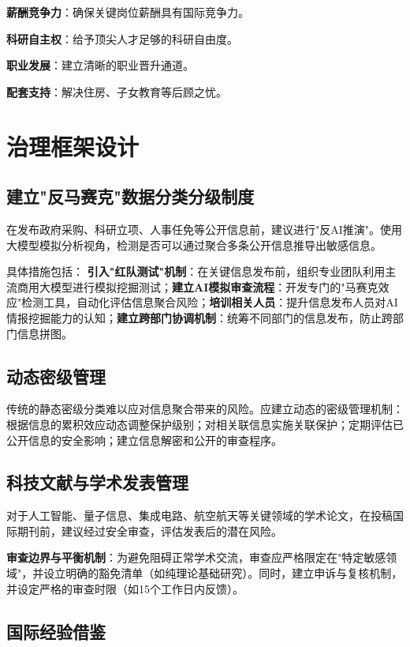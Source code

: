 \textbf{薪酬竞争力}：确保关键岗位薪酬具有国际竞争力。

\textbf{科研自主权}：给予顶尖人才足够的科研自由度。

\textbf{职业发展}：建立清晰的职业晋升通道。

\textbf{配套支持}：解决住房、子女教育等后顾之忧。

\section{治理框架设计}

\subsection{建立"反马赛克"数据分类分级制度}

在发布政府采购、科研立项、人事任免等公开信息前，建议进行"反AI推演"。使用大模型模拟分析视角，检测是否可以通过聚合多条公开信息推导出敏感信息。

具体措施包括：
\textbf{引入"红队测试"机制}：在关键信息发布前，组织专业团队利用主流商用大模型进行模拟挖掘测试；\textbf{建立AI模拟审查流程}：开发专门的"马赛克效应"检测工具，自动化评估信息聚合风险；\textbf{培训相关人员}：提升信息发布人员对AI情报挖掘能力的认知；\textbf{建立跨部门协调机制}：统筹不同部门的信息发布，防止跨部门信息拼图。

\subsection{动态密级管理}

传统的静态密级分类难以应对信息聚合带来的风险。应建立动态的密级管理机制：
根据信息的累积效应动态调整保护级别；对相关联信息实施关联保护；定期评估已公开信息的安全影响；建立信息解密和公开的审查程序。

\subsection{科技文献与学术发表管理}

对于人工智能、量子信息、集成电路、航空航天等关键领域的学术论文，在投稿国际期刊前，建议经过安全审查，评估发表后的潜在风险。

\textbf{审查边界与平衡机制}：为避免阻碍正常学术交流，审查应严格限定在"特定敏感领域"，并设立明确的豁免清单（如纯理论基础研究）。同时，建立申诉与复核机制，并设定严格的审查时限（如15个工作日内反馈）。

\subsection{国际经验借鉴}

